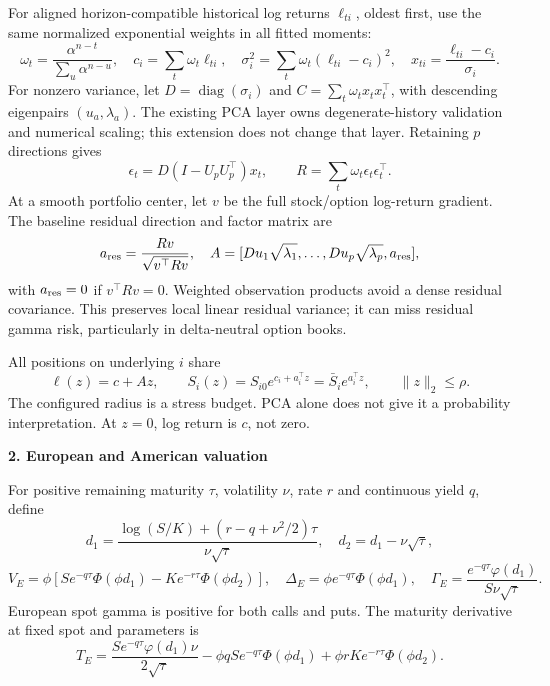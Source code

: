 \documentclass[11pt,a4paper]{article}
\newcommand{\diag}{\operatorname{diag}}
\begin{document}
For aligned horizon-compatible historical log returns $\ell_{ti}$, oldest first,
use the same normalized exponential weights in all fitted moments:
\[
 \omega_t=\frac{\alpha^{n-t}}{\sum_u\alpha^{n-u}},\quad
 c_i=\sum_t\omega_t\ell_{ti},\quad
 \sigma_i^2=\sum_t\omega_t(\ell_{ti}-c_i)^2,\quad
 x_{ti}=\frac{\ell_{ti}-c_i}{\sigma_i}.
\]
For nonzero variance, let $D=\diag(\sigma_i)$ and
$C=\sum_t\omega_t x_tx_t^\top$, with descending eigenpairs $(u_a,\lambda_a)$.
The existing PCA layer owns degenerate-history validation and numerical scaling;
this extension does not change that layer. Retaining $p$ directions gives
\[
 \epsilon_t=D(I-U_pU_p^\top)x_t,\qquad
 R=\sum_t\omega_t\epsilon_t\epsilon_t^\top.
\]
At a smooth portfolio center, let $v$ be the full stock/option log-return
gradient. The baseline residual direction and factor matrix are
\[
 a_{\rm res}=\frac{Rv}{\sqrt{v^\top Rv}},\quad
 A=[Du_1\sqrt{\lambda_1},\ldots,Du_p\sqrt{\lambda_p},a_{\rm res}],
\]
with $a_{\rm res}=0$ if $v^\top Rv=0$. Weighted observation products avoid a dense
residual covariance. This preserves local linear residual variance; it can miss
residual gamma risk, particularly in delta-neutral option books.

All positions on underlying $i$ share
\[
 \ell(z)=c+Az,\qquad S_i(z)=S_{i0}e^{c_i+a_i^\top z}
 =\bar S_i e^{a_i^\top z},\qquad \|z\|_2\leq\rho.
\]
The configured radius is a stress budget. PCA alone does not give it a
probability interpretation. At $z=0$, log return is $c$, not zero.

\newpage
\textbf{2. European and American valuation}

For positive remaining maturity $\tau$, volatility $\nu$, rate $r$ and continuous
yield $q$, define
\[
 d_1=\frac{\log(S/K)+(r-q+\nu^2/2)\tau}{\nu\sqrt\tau},\quad
 d_2=d_1-\nu\sqrt\tau,
\]
\[
 V_E=\phi[Se^{-q\tau}\Phi(\phi d_1)-Ke^{-r\tau}\Phi(\phi d_2)],\quad
 \Delta_E=\phi e^{-q\tau}\Phi(\phi d_1),\quad
 \Gamma_E=\frac{e^{-q\tau}\varphi(d_1)}{S\nu\sqrt\tau}.
\]
European spot gamma is positive for both calls and puts. The maturity derivative
at fixed spot and parameters is
\[
 T_E=\frac{Se^{-q\tau}\varphi(d_1)\nu}{2\sqrt\tau}
 -\phi qSe^{-q\tau}\Phi(\phi d_1)+\phi rKe^{-r\tau}\Phi(\phi d_2).
\]
\end{document}
